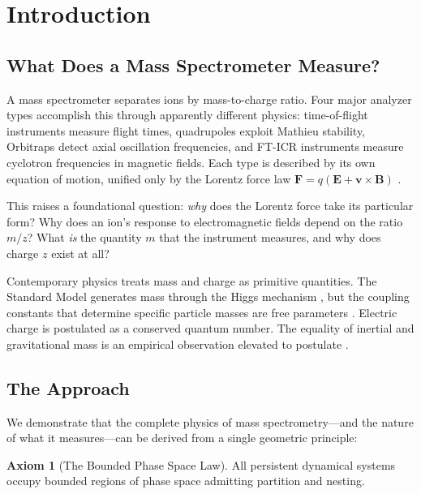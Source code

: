 \documentclass[twocolumn,10pt,a4paper]{article}
\theoremstyle{definition}
\newtheorem{axiom}{Axiom}
\theoremstyle{remark}
\begin{document}
\section{Introduction}
\label{sec:introduction}

\subsection{What Does a Mass Spectrometer Measure?}

A mass spectrometer separates ions by mass-to-charge ratio. Four major analyzer types accomplish this through apparently different physics: time-of-flight instruments measure flight times, quadrupoles exploit Mathieu stability, Orbitraps detect axial oscillation frequencies, and FT-ICR instruments measure cyclotron frequencies in magnetic fields. Each type is described by its own equation of motion, unified only by the Lorentz force law $\mathbf{F} = q(\mathbf{E} + \mathbf{v} \times \mathbf{B})$ \citep{gross2017}.

This raises a foundational question: \emph{why} does the Lorentz force take its particular form? Why does an ion's response to electromagnetic fields depend on the ratio $m/z$? What \emph{is} the quantity $m$ that the instrument measures, and why does charge $z$ exist at all?

Contemporary physics treats mass and charge as primitive quantities. The Standard Model generates mass through the Higgs mechanism \citep{higgs1964,englert1964}, but the coupling constants that determine specific particle masses are free parameters \citep{atlas2012,cms2012}. Electric charge is postulated as a conserved quantum number. The equality of inertial and gravitational mass is an empirical observation elevated to postulate \citep{einstein1916,eotvos1922}.

\subsection{The Approach}

We demonstrate that the complete physics of mass spectrometry---and the nature of what it measures---can be derived from a single geometric principle:

\begin{axiom}[The Bounded Phase Space Law]
\label{ax:bpsl}
All persistent dynamical systems occupy bounded regions of phase space admitting partition and nesting.
\end{axiom}
\end{document}
